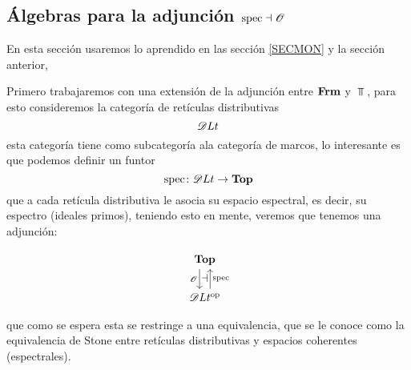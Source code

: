 \documentclass{comunicaciones}
\begin{document}
\subsection[Álgebras para la adjunción]{Álgebras para la adjunción $\spec\dashv \mathcal{O}$}

En esta sección usaremos lo aprendido en las sección \ref{SECMON} y la sección anterior, 

Primero trabajaremos con una extensión de la adjunción entre $\Frm$ y $\Top$, para esto consideremos la categoría de retículas distributivas 
\[\EuScript{D}Lt\] esta categoría tiene como subcategoría ala categoría de marcos, lo interesante es que podemos definir un funtor 
\[\spec\colon\EuScript{D}Lt\rightarrow\Top \] que a cada retícula distributiva le asocia su espacio espectral, es decir, su espectro (ideales primos), teniendo esto en mente, veremos que
tenemos una adjunción:

\[
  \begin{tikzcd}
    \Top \ar[d,shift right=2,"\Cal O"'{name=L}]
    \\
    \EuScript{D}Lt^\op \ar[u,shift right=2,"\spec"'{name=R}]
    \adj{L}{R}
  \end{tikzcd}
\]

que como se espera esta se restringe a una equivalencia, que se le conoce como la equivalencia de Stone entre retículas distributivas y espacios coherentes (espectrales).
\end{document}
